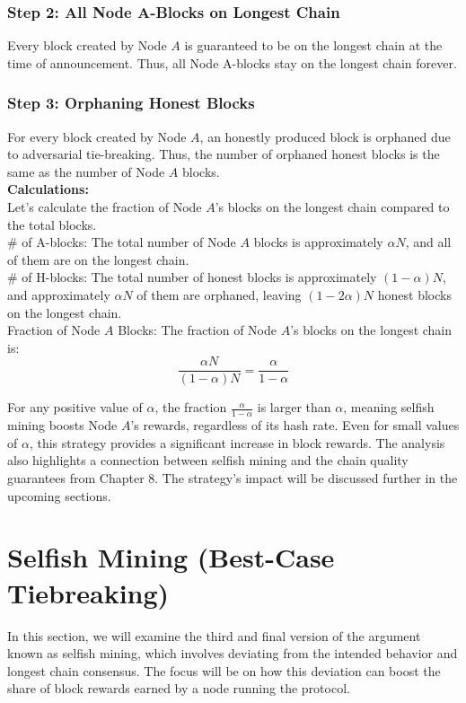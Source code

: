 \subsubsection*{Step 2: All Node A-Blocks on Longest Chain}
Every block created by Node $A$ is guaranteed to be on the longest chain at the time of announcement. Thus, all Node A-blocks stay on the longest chain forever.

\subsubsection*{Step 3: Orphaning Honest Blocks}
For every block created by Node $A$, an honestly produced block is orphaned due to adversarial tie-breaking. Thus, the number of orphaned honest blocks is the same as the number of Node $A$ blocks.\\

\noindent
\textbf{Calculations:}\\
Let's calculate the fraction of Node $A$'s blocks on the longest chain compared to the total blocks.\\
\noindent
\# of A-blocks: The total number of Node $A$ blocks is approximately $\alpha N$, and all of them are on the longest chain.\\
\noindent
\# of H-blocks: The total number of honest blocks is approximately $(1 - \alpha)N$, and approximately $\alpha N$ of them are orphaned, leaving $(1 - 2\alpha)N$ honest blocks on the longest chain.\\

\newpage
\noindent
Fraction of Node $A$ Blocks: The fraction of Node $A$'s blocks on the longest chain is:
$$
\frac{\alpha N}{(1 - \alpha)N} = \frac{\alpha}{1 - \alpha}
$$

For any positive value of $\alpha$, the fraction $\frac{\alpha}{1 - \alpha}$ is larger than $\alpha$, meaning selfish mining boosts Node $A$'s rewards, regardless of its hash rate. Even for small values of $\alpha$, this strategy provides a significant increase in block rewards. The analysis also highlights a connection between selfish mining and the chain quality guarantees from Chapter 8. The strategy's impact will be discussed further in the upcoming sections.

\section{Selfish Mining (Best-Case Tiebreaking)}
In this section, we will examine the third and final version of the argument known as selfish mining, which involves deviating from the intended behavior and longest chain consensus. The focus will be on how this deviation can boost the share of block rewards earned by a node running the protocol.

